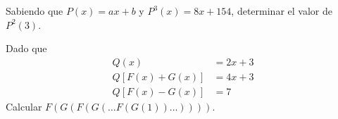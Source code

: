 \begin{multicols}{2}
    \begin{problem}
        Sabiendo que $P(x) = ax + b$ y $P^3(x) = 8x + 154$, determinar el valor de $P^2(3)$.
    \end{problem}

    \begin{problem}
        Dado que
        \begin{align*}
            Q(x) &= 2x + 3 \\
            Q\left[ F(x) + G(x) \right] &= 4x + 3 \\
            Q\left[ F(x) - G(x) \right] &= 7
        \end{align*}
        Calcular $F(G(F(G(\dots F(G(1))\dots))))$.
    \end{problem}
\end{multicols}